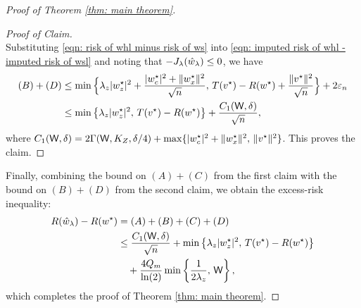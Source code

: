 \begin{proof}[Proof of Theorem \ref{thm: main theorem}]
\begin{proof}[Proof of Claim]
\begin{equation}
    \end{equation}
    Substituting \eqref{eqn: risk of whl minus risk of ws} into \eqref{eqn: imputed risk of whl - imputed risk of wsl} and noting that $-J_\lambda(\hat{w}_\lambda) \leq 0$, we have
    \begin{equation*}
    \begin{aligned}
    (B)+(D) &\leq \min\Big\{\lambda_z|w_z^\star|^2+
       \frac{|w_c^\star|^2+\|w_x^\star\|^2}{\sqrt n},\,
       T(v^\star)-R(w^\star)+\frac{\|v^\star\|^2}{\sqrt n}\Big\} + 2\varepsilon_n \\
       &\le \min\big\{\lambda_z|w_z^\star|^2,\, T(v^\star)-R(w^\star)\big\} + \frac{C_1(\mathsf{W},\delta)}{\sqrt n},
    \end{aligned}
    \end{equation*}
    where $C_1(\mathsf{W},\delta) = 2\Gamma(\mathsf{W},K_Z,\delta/4) + \max\{|w_c^\star|^2+\|w_x^\star\|^2,\, \|v^\star\|^2\}$. This proves the claim.
    \end{proof}

    Finally, combining the bound on $(A)+(C)$ from the first claim with the bound on $(B)+(D)$ from the second claim, we obtain the excess-risk inequality:
    \begin{equation*}
    \begin{aligned}
        R(\hat{w}_\lambda) - R(w^\star) &= (A) + (B) + (C) + (D) \\
        &\leq \frac{C_1(\mathsf{W},\delta)}{\sqrt n} + \min\big\{\lambda_z|w_z^\star|^2,\, T(v^\star)-R(w^\star)\big\} \\
        &\quad + \frac{4Q_m}{\ln(2)}\min\left\{\frac{1}{2\lambda_z},\, \mathsf{W}\right\},
    \end{aligned}
    \end{equation*}
    which completes the proof of Theorem \ref{thm: main theorem}.
\end{proof}
